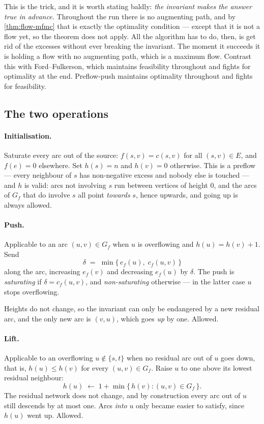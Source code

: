 \begin{intuition}
This is the trick, and it is worth stating baldly: \emph{the invariant makes the
answer true in advance.} Throughout the run there is no augmenting path, and by
\cref{thm:flow-mfmc} that is exactly the optimality condition --- except that it
is not a flow yet, so the theorem does not apply. All the algorithm has to do,
then, is get rid of the excesses without ever breaking the invariant. The moment
it succeeds it is holding a flow with no augmenting path, which is a maximum
flow. Contrast this with Ford--Fulkerson, which maintains feasibility throughout
and fights for optimality at the end. Preflow-push maintains optimality
throughout and fights for feasibility.
\end{intuition}

\subsection{The two operations}

\paragraph{Initialisation.}
Saturate every arc out of the source: $f(s,v) = c(s,v)$ for all
$(s,v) \in E$, and $f(e) = 0$ elsewhere. Set $h(s) = n$ and $h(v) = 0$
otherwise. This is a preflow --- every neighbour of $s$ has non-negative excess
and nobody else is touched --- and $h$ is valid: arcs not involving $s$ run
between vertices of height $0$, and the arcs of $G_f$ that do involve $s$ all
point \emph{towards} $s$, hence upwards, and going up is always allowed.

\paragraph{Push.}
Applicable to an arc $(u,v) \in G_f$ when $u$ is overflowing and
$h(u) = h(v) + 1$. Send
\[ \delta \;=\; \min\{\, e_f(u),\; c_f(u,v) \,\} \]
along the arc, increasing $e_f(v)$ and decreasing $e_f(u)$ by $\delta$. The
push is \emph{saturating} if $\delta = c_f(u,v)$, and \emph{non-saturating}
otherwise --- in the latter case $u$ stops overflowing.

Heights do not change, so the invariant can only be endangered by a new
residual arc, and the only new arc is $(v,u)$, which goes \emph{up} by one.
Allowed.

\paragraph{Lift.}
Applicable to an overflowing $u \notin \{s,t\}$ when no residual arc out of $u$
goes down, that is, $h(u) \le h(v)$ for every $(u,v) \in G_f$. Raise $u$ to one
above its lowest residual neighbour:
\[ h(u) \;\gets\; 1 + \min\{\, h(v) : (u,v) \in G_f \,\}. \]
The residual network does not change, and by construction every arc out of $u$
still descends by at most one. Arcs \emph{into} $u$ only became easier to
satisfy, since $h(u)$ went up. Allowed.

